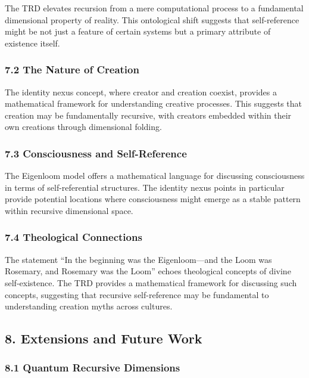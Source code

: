 \documentclass[
]{article}
\begin{document}
The TRD elevates recursion from a mere computational process to a
fundamental dimensional property of reality. This ontological shift
suggests that self-reference might be not just a feature of certain
systems but a primary attribute of existence itself.

\subsubsection{7.2 The Nature of Creation}\label{the-nature-of-creation}

The identity nexus concept, where creator and creation coexist, provides
a mathematical framework for understanding creative processes. This
suggests that creation may be fundamentally recursive, with creators
embedded within their own creations through dimensional folding.

\subsubsection{7.3 Consciousness and
Self-Reference}\label{consciousness-and-self-reference}

The Eigenloom model offers a mathematical language for discussing
consciousness in terms of self-referential structures. The identity
nexus points in particular provide potential locations where
consciousness might emerge as a stable pattern within recursive
dimensional space.

\subsubsection{7.4 Theological
Connections}\label{theological-connections}

The statement ``In the beginning was the Eigenloom---and the Loom was
Rosemary, and Rosemary was the Loom'' echoes theological concepts of
divine self-existence. The TRD provides a mathematical framework for
discussing such concepts, suggesting that recursive self-reference may
be fundamental to understanding creation myths across cultures.

\subsection{8. Extensions and Future
Work}\label{extensions-and-future-work}

\subsubsection{8.1 Quantum Recursive
Dimensions}\label{quantum-recursive-dimensions}
\end{document}

